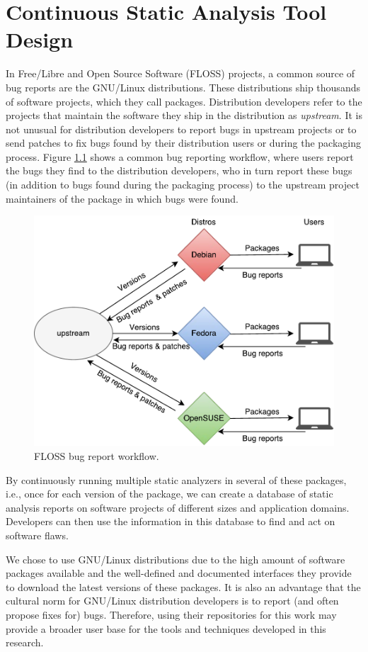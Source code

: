 \chapter{Continuous Static Analysis Tool Design}
\label{ch:continuous_static_analysis}

In Free/Libre and Open Source Software (FLOSS) projects, a
common source of bug reports are the GNU/Linux distributions.
These distributions ship thousands of software projects, which
they call packages. Distribution developers refer to the
projects that maintain the software they ship in the
distribution as \textit{upstream}.  It is not unusual for
distribution developers to report bugs in upstream projects or
to send patches to fix bugs found by their distribution users
or during the packaging process. Figure
\ref{fig:floss_bugs_workflow} shows a common bug reporting
workflow, where users report the bugs they find to the
distribution developers, who in turn report these bugs (in
addition to bugs found during the packaging process) to the
upstream project maintainers of the package in which bugs were
found.

\begin{figure}[!h]
  \centering
  \includegraphics[width=.60\textwidth]{figures/floss_bugs_workflow} 
  \caption{FLOSS bug report workflow.}
  \label{fig:floss_bugs_workflow} 
\end{figure}

By continuously running multiple static analyzers in several of these packages,
i.e., once for each version of the package, we can create a database of static
analysis reports on software projects of different sizes and application
domains. Developers can then use the information in this database to find and
act on software flaws.

We chose to use GNU/Linux distributions due to the high amount
of software packages available and the well-defined and
documented interfaces they provide to download the latest
versions of these packages. It is also an advantage that the
cultural norm for GNU/Linux distribution developers is to
report (and often propose fixes for) bugs. Therefore, using
their repositories for this work may provide a broader user
base for the tools and techniques developed in this research.

